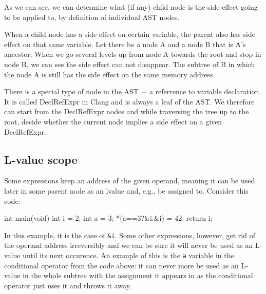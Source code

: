 As we can see, we can determine what (if any) child node is the side effect going to be applied to, by definition of individual AST nodes. 

When a child node has a side effect on certain variable, the parent also has side effect on that same variable. Let there be a node A and a node B that is A's ancestor. When we go several levels up from node A towards the root and stop in node B, we can see the side effect can not disappear. The subtree of B in which the node A is still has the side effect on the same memory address.

There is a special type of node in the AST~--~a referrence to variable declaration. It is called DeclRefExpr in Clang and is always a leaf of the AST. We therefore can start from the DeclRefExpr nodes and while traversing the tree up to the root, decide whether the current node implies a side effect on a given DeclRefExpr.

\subsection{L-value scope}
Some expressions keep an address of the given operand, meaning it can be used later in some parent node as an lvalue and, e.g., be assigned to. Consider this code:
\\\begin{code}
int main(void){
    int i = 2;
    int a = 3;
    *(a==3?&i:&i) = 42;
    return i;
}

\end{code}

In this example, it is the case of \verb|&i|. Some other expressions, however, get rid of the operand address irreversibly and we can be sure it will never be used as an L-value until its next occurence. An example of this is the \verb|a| variable in the conditional operator from the code above: it can never more be used as an L-value in the whole subtree with the assignment it appears in as the conditional operator just uses it and throws it away.

